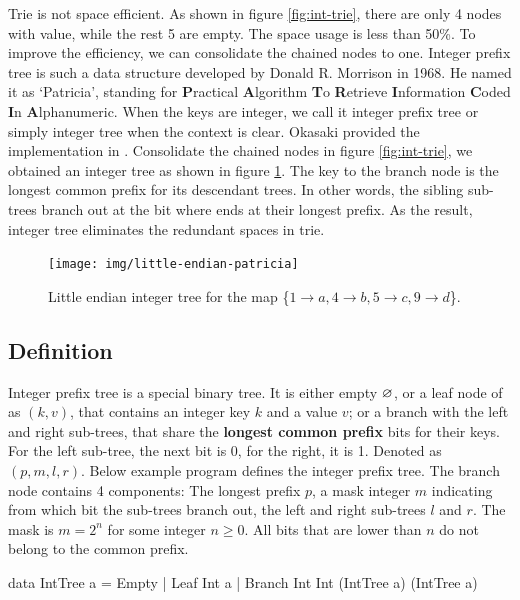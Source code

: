 \documentclass[b5paper]{article}
\begin{document}
Trie is not space efficient. As shown in figure \ref{fig:int-trie}, there are only 4 nodes with value, while the rest 5 are empty. The space usage is less than 50\%. To improve the efficiency, we can consolidate the chained nodes to one. Integer prefix tree is such a data structure developed by Donald R. Morrison in 1968. He named it as `Patricia', standing for \textbf{P}ractical \textbf{A}lgorithm \textbf{T}o \textbf{R}etrieve \textbf{I}nformation \textbf{C}oded \textbf{I}n \textbf{A}lphanumeric\cite{patricia-morrison}. When the keys are integer, we call it integer prefix tree or simply integer tree when the context is clear. Okasaki provided the implementation in \cite{okasaki-int-map}. Consolidate the chained nodes in figure \ref{fig:int-trie}, we obtained an integer tree as shown in figure \ref{fig:little-endian-patricia}. The key to the branch node is the longest common prefix for its descendant trees. In other words, the sibling sub-trees branch out at the bit where ends at their longest prefix. As the result, integer tree eliminates the redundant spaces in trie.

\begin{figure}[htbp]
  \centering
  \texttt{[image: img/little-endian-patricia]}
  \caption{Little endian integer tree for the map
     \{$ 1 \rightarrow a, 4 \rightarrow b, 5 \rightarrow c, 9 \rightarrow d$\}.}
  \label{fig:little-endian-patricia}
\end{figure}

\subsection{Definition}

Integer prefix tree is a special binary tree. It is either empty $\varnothing$, or a leaf node of as $(k, v)$, that contains an integer key $k$ and a value $v$; or a branch with the left and right sub-trees, that share the \textbf{longest common prefix} bits for their keys. For the left sub-tree, the next bit is 0, for the right, it is 1. Denoted as $(p, m, l, r)$. Below example program defines the integer prefix tree. The branch node contains 4 components: The longest prefix $p$, a mask integer $m$ indicating from which bit the sub-trees branch out, the left and right sub-trees $l$ and $r$. The mask is $m = 2^n$ for some integer $n \geq 0$. All bits that are lower than $n$ do not belong to the common prefix.

\begin{Haskell}
data IntTree a = Empty
               | Leaf Int a
               | Branch Int Int (IntTree a) (IntTree a)
\end{Haskell}
\end{document}
